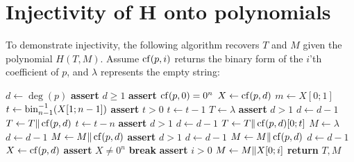 \documentclass[hctr.tex]{subfiles}
\begin{document}
\section{Injectivity of H onto polynomials}\label{injective}
To demonstrate injectivity, 
the following algorithm recovers \(T\) and \(M\) given
the polynomial \(H(T, M)\).
Assume \(\operatorname{cf}(p, i)\) returns the binary form of the \(i\)'th
coefficient of \(p\), and \(\lambda\) represents the empty string:
\begin{algorithmic}[0]
    \State \(d \gets \deg(p)\)
    \State \textbf{assert} \(d \geq 1\)
    \State \textbf{assert} \(\operatorname{cf}(p, 0) = 0^n\)
    \State \(X \gets \operatorname{cf}(p, d)\)
    \State \(m \gets X[0; 1]\)
    \State \(t \gets \operatorname{bin}^{-1}_{n-1}(X[1;n-1])\)
    \State \textbf{assert} \(t > 0\)
    \State \(t \gets t-1\)
    \State \(T \gets \lambda\)
        \State \textbf{assert} \(d > 1\)
        \State \(d \gets d-1\)
        \State \(T \gets T \Vert \operatorname{cf}(p, d)\)
        \State \(t \gets t - n\)
    \EndWhile
        \State \textbf{assert} \(d > 1\)
        \State \(d \gets d-1\)
        \State \(T \gets T \Vert \operatorname{cf}(p, d)[0;t]\)
    \EndIf
    \State \(M \gets \lambda\)
            \State \(d \gets d-1\)
            \State \(M \gets M \Vert \operatorname{cf}(p, d)\)
        \EndWhile
    \Else
        \State \textbf{assert} \(d > 1\)
            \State \(d \gets d-1\)
            \State \(M \gets M \Vert \operatorname{cf}(p, d)\)
        \EndWhile
        \State \(d \gets d-1\)
        \State \(X \gets \operatorname{cf}(p, d)\)
        \State \textbf{assert} \(X \neq 0^n\)
                \State \textbf{break}
            \EndIf
        \EndFor
        \State \textbf{assert} \(i > 0\)
        \State \(M \gets M \Vert X[0;i]\)
    \EndIf
    \State \textbf{return} \(T, M\)
    \EndProcedure
\end{algorithmic}
\end{document}
